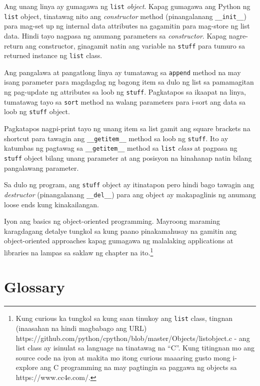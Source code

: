 \documentclass[10pt,]{book}
\begin{document}
Ang unang linya ay gumagawa ng \texttt{list} \emph{object}. Kapag
gumagawa ang Python ng \texttt{list} object, tinatawag nito ang
\emph{constructor} method (pinangalanang \texttt{\_\_init\_\_}) para
mag-set up ng internal data attributes na gagamitin para mag-store ng
list data. Hindi tayo nagpasa ng anumang parameters sa
\emph{constructor}. Kapag nagre-return ang constructor, ginagamit natin
ang variable na \texttt{stuff} para tumuro sa returned instance ng
\texttt{list} class.

Ang pangalawa at pangatlong linya ay tumatawag sa \texttt{append} method
na may isang parameter para magdagdag ng bagong item sa dulo ng list sa
pamamagitan ng pag-update ng attributes sa loob ng \texttt{stuff}.
Pagkatapos sa ikaapat na linya, tumatawag tayo sa \texttt{sort} method
na walang parameters para i-sort ang data sa loob ng \texttt{stuff}
object.

Pagkatapos nagpi-print tayo ng unang item sa list gamit ang square
brackets na shortcut para tawagin ang \texttt{\_\_getitem\_\_} method sa
loob ng \texttt{stuff}. Ito ay katumbas ng pagtawag sa
\texttt{\_\_getitem\_\_} method sa \texttt{list} \emph{class} at pagpasa
ng \texttt{stuff} object bilang unang parameter at ang posisyon na
hinahanap natin bilang pangalawang parameter.

Sa dulo ng program, ang \texttt{stuff} object ay itinatapon pero hindi
bago tawagin ang \emph{destructor} (pinangalanang \texttt{\_\_del\_\_})
para ang object ay makapaglinis ng anumang loose ends kung
kinakailangan.

Iyon ang basics ng object-oriented programming. Mayroong maraming
karagdagang detalye tungkol sa kung paano pinakamahusay na gamitin ang
object-oriented approaches kapag gumagawa ng malalaking applications at
libraries na lampas sa saklaw ng chapter na ito.\footnote{Kung curious
  ka tungkol sa kung saan tinukoy ang \texttt{list} class, tingnan
  (inaasahan na hindi magbabago ang URL)
  https://github.com/python/cpython/blob/master/Objects/listobject.c -
  ang list class ay isinulat sa language na tinatawag na ``C''. Kung
  titingnan mo ang source code na iyon at makita mo itong curious
  maaaring gusto mong i-explore ang C programming na may pagtingin sa
  paggawa ng objects sa https://www.cc4e.com/.}

\section{Glossary}\label{glossary-13}
\end{document}
